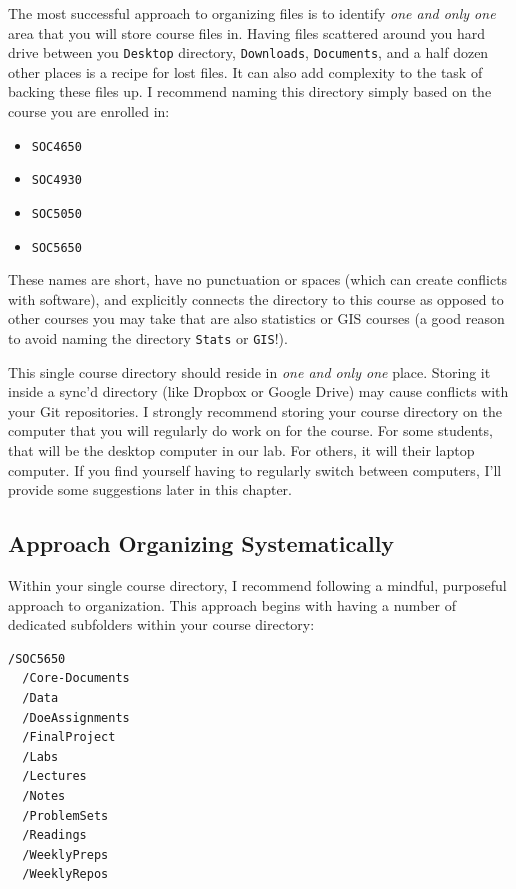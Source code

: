 \documentclass[]{book}
\providecommand{\tightlist}{%
  \setlength{\itemsep}{0pt}\setlength{\parskip}{0pt}}
\theoremstyle{definition}
\theoremstyle{definition}
\theoremstyle{definition}
\theoremstyle{remark}
\begin{document}
The most successful approach to organizing files is to identify
\emph{one and only one} area that you will store course files in. Having
files scattered around you hard drive between you \texttt{Desktop}
directory, \texttt{Downloads}, \texttt{Documents}, and a half dozen
other places is a recipe for lost files. It can also add complexity to
the task of backing these files up. I recommend naming this directory
simply based on the course you are enrolled in:

\begin{itemize}
\tightlist
\item
  \texttt{SOC4650}
\item
  \texttt{SOC4930}
\item
  \texttt{SOC5050}
\item
  \texttt{SOC5650}
\end{itemize}

These names are short, have no punctuation or spaces (which can create
conflicts with software), and explicitly connects the directory to this
course as opposed to other courses you may take that are also statistics
or GIS courses (a good reason to avoid naming the directory
\texttt{Stats} or \texttt{GIS}!).

This single course directory should reside in \emph{one and only one}
place. Storing it inside a sync'd directory (like Dropbox or Google
Drive) may cause conflicts with your Git repositories. I strongly
recommend storing your course directory on the computer that you will
regularly do work on for the course. For some students, that will be the
desktop computer in our lab. For others, it will their laptop computer.
If you find yourself having to regularly switch between computers, I'll
provide some suggestions later in this chapter.

\subsection{Approach Organizing
Systematically}\label{approach-organizing-systematically}

Within your single course directory, I recommend following a mindful,
purposeful approach to organization. This approach begins with having a
number of dedicated subfolders within your course directory:

\begin{verbatim}
/SOC5650
  /Core-Documents
  /Data
  /DoeAssignments
  /FinalProject
  /Labs
  /Lectures
  /Notes
  /ProblemSets
  /Readings
  /WeeklyPreps
  /WeeklyRepos
\end{verbatim}
\end{document}
